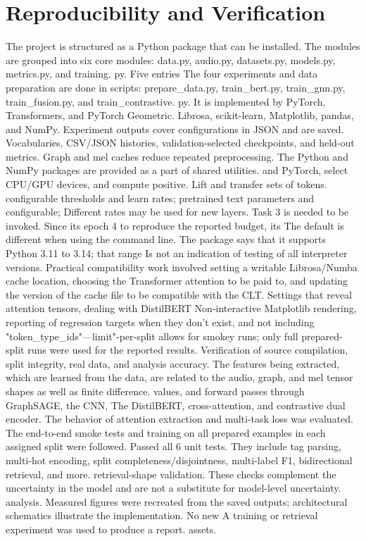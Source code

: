\documentclass[10pt,twocolumn,letterpaper]{article}
\begin{document}
\section{Reproducibility and Verification}
The project is structured as a Python package that can be installed. The modules are grouped into six core modules: data.py, audio.py, datasets.py, models.py, metrics.py, and training. py. Five entries The four experiments and data preparation are done in scripts: prepare\_data.py, train\_bert.py, train\_gnn.py, train\_fusion.py, and train\_contrastive. py. It is implemented by PyTorch, Transformers, and PyTorch Geometric. Librosa, scikit-learn, Matplotlib, pandas, and NumPy. Experiment outputs cover configurations in JSON and are saved. Vocabularies, CSV/JSON histories, validation-selected checkpoints, and held-out metrics. Graph and mel caches reduce repeated preprocessing. The Python and NumPy packages are provided as a part of shared utilities. and PyTorch, select CPU/GPU devices, and compute positive. Lift and transfer sets of tokens. configurable thresholds and learn rates; pretrained text parameters and configurable; Different rates may be used for new layers. Task 3 is needed to be invoked. Since its epoch 4 to reproduce the reported budget, its The default is different when using the command line. The package says that it supports Python 3.11 to 3.14; that range Is not an indication of testing of all interpreter versions. Practical compatibility work involved setting a writable Librosa/Numba cache location, choosing the Transformer attention to be paid to, and updating the version of the cache file to be compatible with the CLT. Settings that reveal attention tensors, dealing with DistilBERT Non-interactive Matplotlib rendering, reporting of regression targets when they don't exist, and not including "token\_type\_ids"---limit"-per-split allows for smokey runs; only full prepared-split runs were used for the reported results. Verification of source compilation, split integrity, real data, and analysis accuracy. The features being extracted, which are learned from the data, are related to the audio, graph, and mel tensor shapes as well as finite difference. values, and forward passes through GraphSAGE, the CNN, The DistilBERT, cross-attention, and contrastive dual encoder. The behavior of attention extraction and multi-task loss was evaluated. The end-to-end smoke tests and training on all prepared examples in each assigned split were followed. Passed all 6 unit tests. They include tag parsing, multi-hot encoding, split completeness/disjointness, multi-label F1, bidirectional retrieval, and more. retrieval-shape validation. These checks complement the uncertainty in the model and are not a substitute for model-level uncertainty. analysis. Measured figures were recreated from the saved outputs; architectural schematics illustrate the implementation. No new A training or retrieval experiment was used to produce a report. assets.
\end{document}
